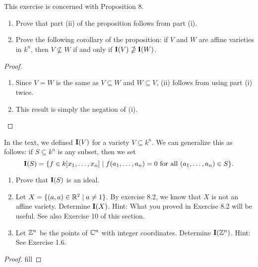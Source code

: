 \begin{exercise}{14}
This exercise is concerned with Proposition 8.
\begin{enumerate}
    \item Prove that part (ii) of the proposition follows from part (i).
    \item Prove the following corollary of the proposition: if $V$ and $W$ are affine varieties in $k^n$, then $V\nsubseteq W$ if and only if $\mathbf{I}(V)\nsupseteq\mathbf{I}(W)$.
\end{enumerate}
\end{exercise}
\begin{proof}
\begin{enumerate}
    \item Since $V=W$ is the same as $V\subseteq W$ and $W\subseteq V$, (ii) follows from using part (i) twice.
    \item This result is simply the negation of (i).
\end{enumerate}
\end{proof}

\begin{exercise}{15}
In the text, we defined $\mathbf{I}(V)$ for a variety $V\subseteq k^n$. We can generalize this as follows: if $S\subseteq k^n$ is any subset, then we set
\[
\mathbf{I}(S)=\{f\in k[x_1,\dots,x_n]\mid f(a_1,\dots,a_n)=0\text{ for all }(a_1,\dots,a_n)\in S\}.
\]
\begin{enumerate}
    \item Prove that $\mathbf{I}(S)$ is an ideal.
    \item Let $X=\{(a,a)\in\mathbb{R}^2\mid a\neq 1\}$. By exercise 8.2, we know that $X$ is not an affine variety. Determine $\mathbf{I}(X)$. Hint: What you proved in Exercise 8.2 will be useful. See also Exercise 10 of this section.
    \item Let $\mathbb{Z}^n$ be the points of $\mathbb{C}^n$ with integer coordinates. Determine $\mathbf{I}(\mathbb{Z}^n)$. Hint: See Exercise 1.6.
\end{enumerate}
\end{exercise}
\begin{proof}
fill
\end{proof}
